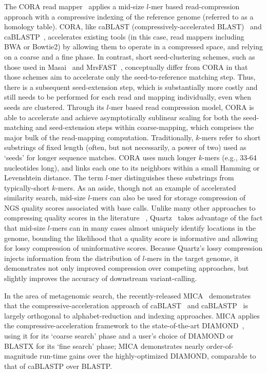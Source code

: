\documentclass{acm_proc_article-sp}
\begin{document}
The CORA read mapper~\cite{yorukoglu2015compressive} applies a mid-size $l$-mer based 
read-compression approach with a compressive indexing of the reference genome
(referred to as a homology table).
CORA, like caBLAST (compressively-accelerated BLAST)~\cite{loh2012compressive} and 
caBLASTP~\cite{daniels2013compressive}, accelerates existing tools (in this 
case, read
mappers including BWA or Bowtie2) by allowing them to operate in a compressed
space, and relying on a coarse and a fine phase.
In contrast, short seed-clustering schemes, such as those used in Masai~\cite{siragusa2013fast} and 
MrsFAST~\cite{berger2013computational}, conceptually differ from CORA in that those 
schemes aim to accelerate only the seed-to-reference matching step.
Thus, there is a subsequent seed-extension step, which is substantially more 
costly and still needs to be performed for each read and mapping individually, 
even when seeds are clustered. 
Through its $l$-mer based read compression model, CORA is able to accelerate 
and 
achieve asymptotically sublinear scaling for both the seed-matching and 
seed-extension steps within coarse-mapping, which comprises the major bulk of 
the read-mapping computation.
Traditionally, $k$-mers refer to short substrings of fixed length (often, but 
not necessarily, a power of two) used as `seeds' for longer sequence matches.
CORA uses much longer $k$-mers (e.g., 33-64 nucleotides long), and links each 
one to its neighbors within a small Hamming or Levenshtein distance.
The term $l$-mer distinguishes these substrings from typically-short $k$-mers.
As an aside, though not an example of accelerated similarity search, mid-size $l$-mers
can also be used for storage compression of NGS quality scores associated with base calls.
Unlike many other approaches to compressing quality scores in the literature
~\cite{bonfield2013compression,ochoa2013qualcomp},
Quartz~\cite{yu2015quality} takes advantage of the fact that mid-size $l$-mers can in many cases almost uniquely identify locations in the genome,
bounding the likelihood that a quality score is informative and allowing for lossy compression of uninformative scores.
Because Quartz's lossy compression injects information from the distribution of $l$-mers in the target genome, it demonstrates not only improved compression over competing
approaches, but slightly improves the accuracy of downstream variant-calling.

In the area of metagenomic search,
the recently-released MICA~\cite{yu2015entropy} demonstrates that the 
compressive-acceleration approach of 
caBLAST~\cite{loh2012compressive} and caBLASTP~\cite{daniels2013compressive} is 
largely orthogonal to alphabet-reduction and indexing approaches.
MICA applies the compressive-acceleration framework to the
state-of-the-art DIAMOND~\cite{buchfink2014fast}, using it
for its `coarse search' phase and a user's choice of DIAMOND or BLASTX for its
`fine search' phase; MICA demonstrates nearly order-of-magnitude run-time gains over the highly-optimized DIAMOND, comparable to that of caBLASTP over BLASTP.
\end{document}
